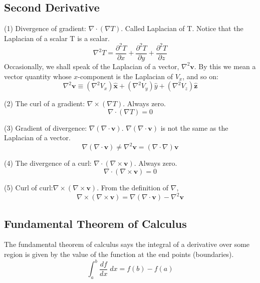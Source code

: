\documentclass[../main.tex]{subfiles}
\begin{document}
\subsection*{Second Derivative}

(1) Divergence of gradient: $\nabla \cdot (\nabla T)$. 
Called Laplacian of T. Notice that the Laplacian of a scalar T is a scalar. 
\begin{equation*}
    \nabla^2 T=\frac{\partial^2T}{\partial x}+\frac{\partial^2T}{\partial y}+\frac{\partial^2T}{\partial z}
\end{equation*}
Occasionally, we shall speak of the Laplacian of a vector, $\nabla ^2  \mathbf{v}$. By this we mean a vector quantity whose $x$-component is the Laplacian of $V_x$, and so on:
\begin{equation*}
    \nabla^2 \mathbf{v} \equiv (\nabla^2 V_x ) \mathbf{\hat{x}} + (\nabla^2 V_y)\hat{y} + (\nabla^2 V_z ) \mathbf{\hat{z}}
\end{equation*}

(2) The curl of a gradient: $\nabla \times (\nabla T)$. Always zero.
\begin{equation*}
    \nabla \cdot (\nabla T)=0
\end{equation*}

(3) Gradient of divergence: $\nabla  (\nabla \cdot  \mathbf{v})$. 
$\nabla  (\nabla \cdot  \mathbf{v})$ is not the same as the Laplacian of a vector.
\begin{equation*}
    \nabla  (\nabla \cdot  \mathbf{v}) \neq \nabla^2  \mathbf{v} = (\nabla \cdot \nabla)  \mathbf{v} 
\end{equation*}

(4) The divergence of a curl: $\nabla  \cdot (\nabla \times  \mathbf{v})$. Always zero.
\begin{equation*}
    \nabla \cdot (\nabla \times  \mathbf{v})=0
\end{equation*}

(5) Curl of curl:$\nabla \times (\nabla \times  \mathbf{v})$. From the definition of $\nabla$, 
\begin{equation*}
    \nabla \times (\nabla \times  \mathbf{v})=\nabla (\nabla \cdot  \mathbf{v})-\nabla^2 \mathbf{v}
\end{equation*}

\subsection*{Fundamental Theorem of Calculus}
The fundamental theorem of calculus says the integral of a derivative over some region is given by the value of the function at the end points (boundaries). 
\begin{equation*}
    \int_{a}^{b} \frac{df}{dx}\;dx=f(b)-f(a)
\end{equation*}
\end{document}
